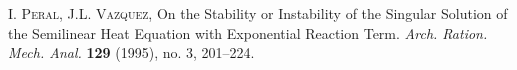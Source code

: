 \begin{thebibliography}{99}
    \textsc{I. Peral, J.L. Vazquez,} On the Stability or Instability of the Singular Solution of the Semilinear Heat Equation with Exponential Reaction Term. \textit{Arch. Ration. Mech. Anal.} 
\textbf{129} (1995),  no. 3, 201--224.

\normalsize
\begin{center}
\resizebox{.5\linewidth}{!}{\color{azulsema}\rule{.5\linewidth}{1pt}
{\large $\diamond$} {\huge $\diamond$} {\large $\diamond$} \rule{.5\linewidth}{1pt}}
\end{center}
\end{thebibliography}

%
%


